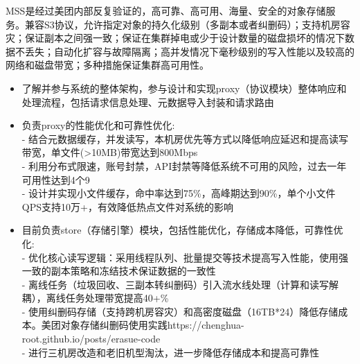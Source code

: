 \documentclass{resume}
\begin{document}
MSS是经过美团内部反复验证的，高可靠、高可用、海量、安全的对象存储服务。兼容S3协议，允许指定对象的持久化级别（多副本或者纠删码）；支持机房容灾；保证副本之间强一致；保证在集群掉电或少于设计数量的磁盘损坏的情况下数据不丢失；自动化扩容与故障隔离；高并发情况下毫秒级别的写入性能以及较高的网络和磁盘带宽；多种措施保证集群高可用性。
\begin{itemize}
  \item 了解并参与系统的整体架构，参与设计和实现proxy（协议模块）整体响应和处理流程，包括请求信息处理、元数据导入封装和请求路由
\end{itemize}
\begin{itemize}
  \item 负责proxy的性能优化和可靠性优化:\\
  - 结合元数据缓存，并发读写，本机房优先等方式以降低响应延迟和提高读写带宽，单文件(>10MB)带宽达到800Mbps\\
  - 利用分布式限速，账号封禁，API封禁等降低系统不可用的风险，过去一年可用性达到4个9\\
  - 设计并实现小文件缓存，命中率达到75\%，高峰期达到90\%，单个小文件QPS支持10万+，有效降低热点文件对系统的影响
\end{itemize}
\begin{itemize}
  \item 目前负责store（存储引擎）模块，包括性能优化，存储成本降低，可靠性优化:\\
  - 优化核心读写逻辑：采用线程队列、批量提交等技术提高写入性能，使用强一致的副本策略和冻结技术保证数据的一致性\\
  - 离线任务（垃圾回收、三副本转纠删码）引入流水线处理（计算和读写解耦），离线任务处理带宽提高40+\%\\
  - 使用纠删码存储（支持跨机房容灾）和高密度磁盘（16TB*24）降低存储成本。美团对象存储纠删码使用实践https://chenghua-root.github.io/posts/erasue-code\\
  - 进行三机房改造和老旧机型淘汰，进一步降低存储成本和提高可靠性
\end{itemize}

\end{document}
